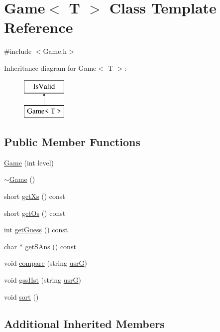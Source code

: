 \hypertarget{class_game}{}\section{Game$<$ T $>$ Class Template Reference}
\label{class_game}


{\ttfamily \#include $<$Game.\+h$>$}

Inheritance diagram for Game$<$ T $>$\+:\begin{figure}[H]
\begin{center}
\leavevmode
\includegraphics[height=2.000000cm]{class_game}
\end{center}
\end{figure}
\subsection*{Public Member Functions}
\begin{DoxyCompactItemize}
\item 
\hyperlink{class_game_a8d00e68144fea1d245b30021ff9a5d9b}{Game} (int level)
\item 
\hyperlink{class_game_ac98b054acf64c7ac2c7c780e79b4f618}{$\sim$\+Game} ()
\item 
short \hyperlink{class_game_acff364fb95406f49b3b0028037a787f5}{get\+Xs} () const 
\item 
short \hyperlink{class_game_a1ccc9a160aa4c0617142efbd8f654945}{get\+Os} () const 
\item 
int \hyperlink{class_game_a08ac615fa1cf399c206bcadf47109388}{get\+Guess} () const 
\item 
char $\ast$ \hyperlink{class_game_a89e9b1725d7e2e8eb3996837784e7ec4}{get\+S\+Ans} () const 
\item 
void \hyperlink{class_game_a9e6bcc1ae8e19bc25b9cfa39beb29c5a}{compare} (string \hyperlink{class_is_valid_adbf865b1f62a0967106b899e15bbc6cb}{usr\+G})
\item 
void \hyperlink{class_game_ad5e14b31647a4da393b4837d89ba57e1}{gss\+Hst} (string \hyperlink{class_is_valid_adbf865b1f62a0967106b899e15bbc6cb}{usr\+G})
\item 
void \hyperlink{class_game_ae7b3779e9ea40bceff534c31a1b4b9be}{sort} ()
\end{DoxyCompactItemize}
\subsection*{Additional Inherited Members}


